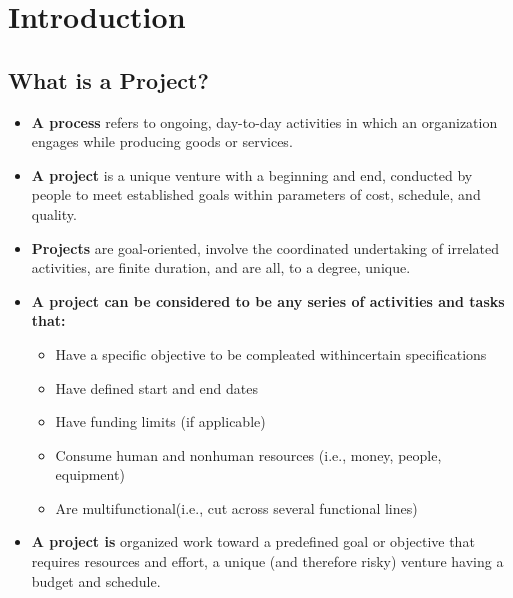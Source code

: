 \chapter{Introduction}

\section{What is a Project?}

	\begin{itemize}
		\item{\bf A process} refers to ongoing, day-to-day activities in which an 
		organization engages while producing goods or services.
		\item{\bf A project} is a unique venture with a beginning and end, conducted by people
		to meet established goals within parameters of cost, schedule, and quality. 
		\item{\bf Projects} are goal-oriented, involve the coordinated undertaking of 
		irrelated activities, are finite duration, and are all, to a degree, unique.
		\item{\bf A project can be considered to be any series of activities and tasks that:}
			\begin{itemize}
				\item Have a specific objective to be compleated withincertain specifications
				\item Have defined start and end dates
				\item Have funding limits (if applicable)
				\item Consume human and nonhuman resources (i.e., money, people, equipment)
				\item Are multifunctional(i.e., cut across several functional lines)
			\end{itemize} 
		\item{\bf A project is} organized work toward a predefined goal or objective that
		requires resources and effort, a unique (and therefore risky) venture having a 
		budget and schedule. 
	\end{itemize}